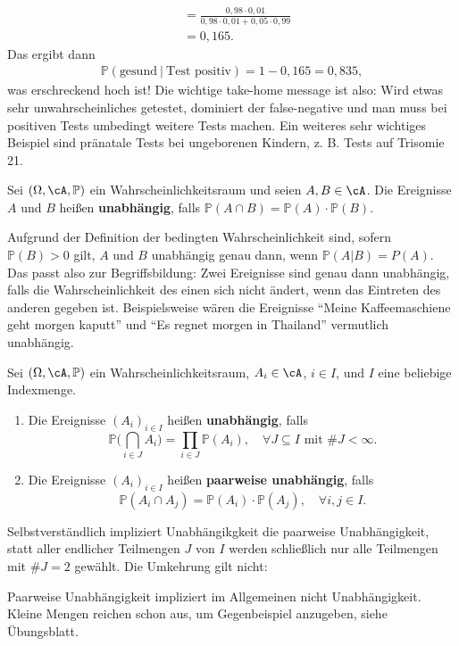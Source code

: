 \begin{beispiel}
\begin{enumerate}[label=(\roman*)]
\begin{align*}
			&= \frac{0,98 \cdot 0,01}{0,98 \cdot 0,01 + 0,05 \cdot 0,99} \\
			&= 0,165.
		\end{align*}
		Das ergibt dann
		\begin{align*}
			\mathbb{P}(\text{gesund} \: | \: \text{Test positiv}) = 1 - 0,165 = 0,835,
		\end{align*}
		was erschreckend hoch ist! Die wichtige take-home message ist also: Wird etwas sehr unwahrscheinliches getestet, dominiert der false-negative und man muss bei positiven Tests umbedingt weitere Tests machen. Ein weiteres sehr wichtiges Beispiel sind pr\"anatale Tests bei ungeborenen Kindern, z. B. Tests auf Trisomie 21.
	\end{enumerate}
\end{beispiel}

\begin{deff}
	Sei $(\Omega, \cA, \mathbb{P})$ ein Wahrscheinlichkeitsraum und seien $A,B \in \cA$. Die Ereignisse $A$ und $B$ heißen \textbf{unabhängig}, falls $\mathbb{P}(A \cap B) = \mathbb{P}(A) \cdot \mathbb{P}(B)$.
\end{deff}
Aufgrund der Definition der bedingten Wahrscheinlichkeit sind, sofern $\mathbb P(B)>0$ gilt, $A$ und $B$ unabh\"angig genau dann, wenn $\mathbb P(A|B)=P(A)$. Das passt also zur Begriffsbildung: Zwei Ereignisse sind genau dann unabh\"angig, falls die Wahrscheinlichkeit des einen sich nicht \"andert, wenn das Eintreten des anderen gegeben ist. Beispielsweise w\"aren die Ereignisse \enquote{Meine Kaffeemaschiene geht morgen kaputt} und \enquote{Es regnet morgen in Thailand} vermutlich unabh\"angig. 

\begin{deff}
	Sei $(\Omega, \cA, \mathbb{P})$ ein Wahrscheinlichkeitsraum, $A_i \in \cA$, $i \in I$, und $I$ eine beliebige Indexmenge.
	\begin{enumerate}[label=(\roman*)]
		\item Die Ereignisse ${(A_i)}_{i\in I}$ heißen \textbf{unabhängig}, falls 
		\[ \mathbb{P}\Big(\bigcap_{i \in J} A_i \Big) = \prod\limits_{i \in J} \mathbb{P}(A_i),\quad \forall J \subseteq I \text{ mit }  \# J<\infty. \]
		\item Die Ereignisse ${(A_i)}_{i\in I}$ heißen \textbf{paarweise unabhängig}, falls 
		$$\mathbb{P}(A_i \cap A_j) = \mathbb{P}(A_i) \cdot \mathbb{P}(A_j), \quad \forall i,j \in I.$$
	\end{enumerate}
\end{deff}
Selbstverst\"andlich impliziert Unabh\"angikgkeit die paarweise Unabh\"angigkeit, statt aller endlicher Teilmengen $J$ von $I$ werden schlie\ss lich nur alle Teilmengen mit $\# J=2$ gew\"ahlt. Die Umkehrung gilt nicht:
\begin{warnung}
	Paarweise Unabhängigkeit impliziert im Allgemeinen nicht Unabhängigkeit. Kleine Mengen reichen schon aus, um Gegenbeispiel anzugeben, siehe \"Ubungsblatt.
\end{warnung}

